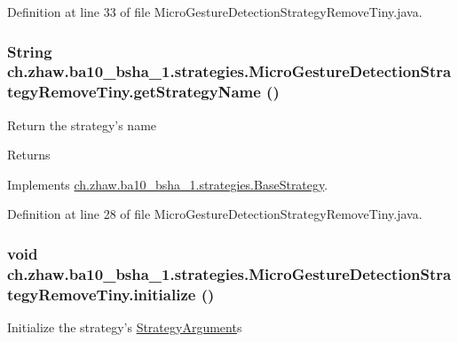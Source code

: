 Definition at line 33 of file MicroGestureDetectionStrategyRemoveTiny.java.\hypertarget{classch_1_1zhaw_1_1ba10__bsha__1_1_1strategies_1_1MicroGestureDetectionStrategyRemoveTiny_a95ac0cb1ddbc1a667e2b5c2dd05dbcdf}{
\subsubsection[{getStrategyName}]{\setlength{\rightskip}{0pt plus 5cm}String ch.zhaw.ba10\_\-bsha\_\-1.strategies.MicroGestureDetectionStrategyRemoveTiny.getStrategyName ()}}
\label{classch_1_1zhaw_1_1ba10__bsha__1_1_1strategies_1_1MicroGestureDetectionStrategyRemoveTiny_a95ac0cb1ddbc1a667e2b5c2dd05dbcdf}
Return the strategy's name

\begin{DoxyReturn}{Returns}

\end{DoxyReturn}


Implements \hyperlink{classch_1_1zhaw_1_1ba10__bsha__1_1_1strategies_1_1BaseStrategy_aa0ebed55eed45409bad13d43a0058780}{ch.zhaw.ba10\_\-bsha\_\-1.strategies.BaseStrategy}.

Definition at line 28 of file MicroGestureDetectionStrategyRemoveTiny.java.\hypertarget{classch_1_1zhaw_1_1ba10__bsha__1_1_1strategies_1_1MicroGestureDetectionStrategyRemoveTiny_af72863c74640818ca3bf5ccba7957224}{
\subsubsection[{initialize}]{\setlength{\rightskip}{0pt plus 5cm}void ch.zhaw.ba10\_\-bsha\_\-1.strategies.MicroGestureDetectionStrategyRemoveTiny.initialize ()}}
\label{classch_1_1zhaw_1_1ba10__bsha__1_1_1strategies_1_1MicroGestureDetectionStrategyRemoveTiny_af72863c74640818ca3bf5ccba7957224}
Initialize the strategy's \hyperlink{classch_1_1zhaw_1_1ba10__bsha__1_1_1StrategyArgument}{StrategyArgument}s 

